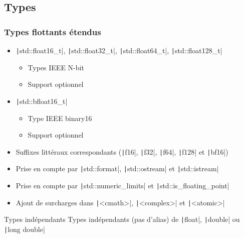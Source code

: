 \documentclass[C++.tex]{subfiles}
\begin{document}
\subsection*{Types}
\begin{frame}[fragile]
	\frametitle{Types flottants étendus}
	\begin{itemize}
		\item \texttt|std::float16_t|, \texttt|std::float32_t|, \texttt|std::float64_t|, \texttt|std::float128_t|
		\begin{itemize}
			\item Types IEEE N-bit
			\item Support optionnel
		\end{itemize}
		\item \texttt|std::bfloat16_t|
		\begin{itemize}
			\item Type IEEE binary16
			\item Support optionnel
		\end{itemize}
		\item Suffixes littéraux correspondants (\texttt|f16|, \texttt|f32|, \texttt|f64|, \texttt|f128| et \texttt|bf16|)
		\item Prise en compte par \texttt|std::format|, \texttt|std::ostream| et \texttt|std::istream|
		\item Prise en compte par \texttt|std::numeric_limits| et \texttt|std::is_floating_point|
		\item Ajout de surcharges dans \texttt|<cmath>|, \texttt|<complex>| et \texttt|<atomic>|
	\end{itemize}

	\begin{alertblock}{Types indépendants}
		Types indépendants (pas d'alias) de \texttt|float|, \texttt|double| ou \texttt|long double|
	\end{alertblock}



\end{frame}
\end{document}
